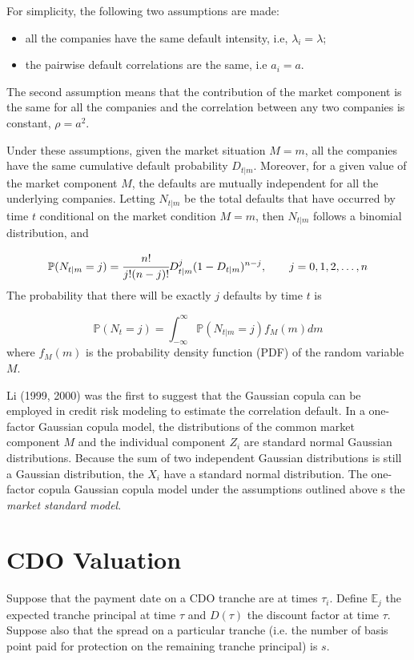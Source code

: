 For simplicity, the following two assumptions are made:
\begin{itemize}
\item all the companies have the same default intensity, i.e, $\lambda_i = \lambda$;
\item the pairwise default correlations are the same, i.e $a_i = a$.
\end{itemize}
The second assumption means that the contribution of the market component is
the same for all the companies and the correlation between any two companies is
constant, $\rho = a^2$.

Under these assumptions, given the market situation $M = m$, all the companies
have the same cumulative default probability $D_{t|m}$. Moreover, for a
given value of the market component $M$, the defaults are mutually independent for
all the underlying companies. Letting $N_{t|m}$ be the total defaults that have occurred
by time $t$ conditional on the market condition $M = m$, then $N_{t|m}$ follows a binomial
distribution, and

\[\mathbb{P}(N_{t|m} = j) = \cfrac{n!}{j!(n-j)!}D^j_{t|m}(1-D_{t|m})^{n-j},\qquad  j=0, 1, 2,\ldots,n\]
The probability that there will be exactly $j$ defaults by time $t$ is

\[\mathbb{P}(N_{t} = j) = \int_{-\infty}^{\infty}{\mathbb{P}(N_{t|m} = j)f_M(m)dm}\]
where $f_M(m)$ is the probability density function (PDF) of the random variable $M$.

Li (1999, 2000) was the first to suggest that the Gaussian copula can be employed
in credit risk modeling to estimate the correlation default. In a one-factor Gaussian
copula model, the distributions of the common market component $M$ and the individual component $Z_i$
are standard normal Gaussian distributions.
Because the sum of two independent Gaussian distributions is still a Gaussian distribution, the $X_i$
have a standard normal distribution.
The one-factor copula Gaussian copula model under the assumptions outlined above s the \emph{market standard model}.

\section{CDO Valuation}
Suppose that the payment date on a CDO tranche are at times $\tau_i$. Define $\mathbb{E}_j$ the expected 
tranche principal at time $\tau$ and $D(\tau)$ the discount factor at time $\tau$. Suppose also that the spread
on a particular tranche (i.e. the number of basis point paid for protection on the remaining tranche principal) is $s$. 

